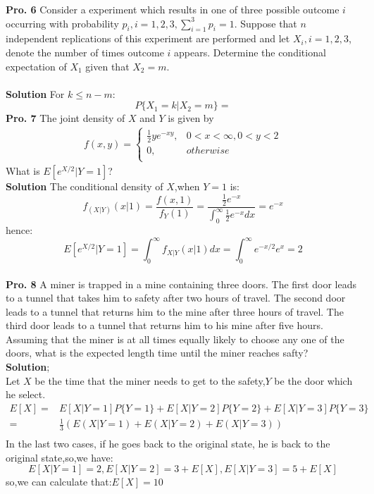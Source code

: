 \documentclass[12pt,onecolumn,journal]{IEEEtran}
\begin{document}
\textbf{Pro. 6} Consider a experiment which results in one of three possible outcome $i$ occurring with probability $p_i,i=1,2,3,\sum^3_{i=1}{p_i}=1$. Suppose that $n$ independent replications of this experiment are performed and let $X_i,i=1,2,3$, denote the number of times outcome $i$ appears. Determine the conditional expectation of $X_1$ given that $X_2=m$.\\
\\
\textbf{Solution}
{
For $k \leq n-m$:
\[P\{X_1=k|X_2=m\}=\]
}
\textbf{Pro. 7} The joint density of $X$ and $Y$ is given by
\begin{eqnarray*}%
f(x,y)=
               \begin{cases}
                \frac{1}{2}ye^{-xy},    & 0<x<\infty,0<y<2 \\
                 0,  & otherwise\\
               \end{cases}
\end{eqnarray*}
What is $E[e^{X/2}|Y=1]$?
\\
\textbf{Solution}
\textcolor[rgb]{1,0,0}
{
The conditional density of $X$,when $Y=1$ is:
\[f_{(X|Y)}(x|1)=\frac{f(x,1)}{f_Y(1)}=\frac{\frac{1}{2}e^{-x}}{\int_{0}^{\infty}\frac{1}{2}e^{-x}dx}=e^{-x}\]
hence:
\[E[e^{X/2}|Y=1]=\int_{0}^{\infty}f_{X|Y}(x|1)dx=\int_{0}^{\infty}e^{-x/2}e^x=2\]
}
\\
\textbf{Pro. 8} A miner is trapped in a mine containing three doors. The first door leads to a tunnel that takes him to safety after two hours of travel. The second door leads to a tunnel that returns him to the mine after three hours of travel. The third door leads to a tunnel that returns him to his mine after five hours. Assuming that the miner is at all times equally likely to choose any one of the doors, what is the expected length time until the miner reaches safty?
\\
\textbf{Solution};
\\
\textcolor[rgb]{1,0,0}
{
Let $X$ be the time that the miner needs to get to the safety,$Y$ be the door which he select.
\[
\begin{aligned}
E[X]=&E[X|Y=1]P\{Y=1\}+E[X|Y=2]P\{Y=2\}+E[X|Y=3]P\{Y=3\}&\\
=&\frac{1}{3}(E(X|Y=1)+E(X|Y=2)+E(X|Y=3))&\\
\end{aligned}
\]
In the last two cases, if he goes back to the original state, he is back to the original state,so,we have:
\[E[X|Y=1]=2,E[X|Y=2]=3+E[X],E[X|Y=3]=5+E[X]\]
so,we can calculate that:$E[X]=10$
}
\end{document}

